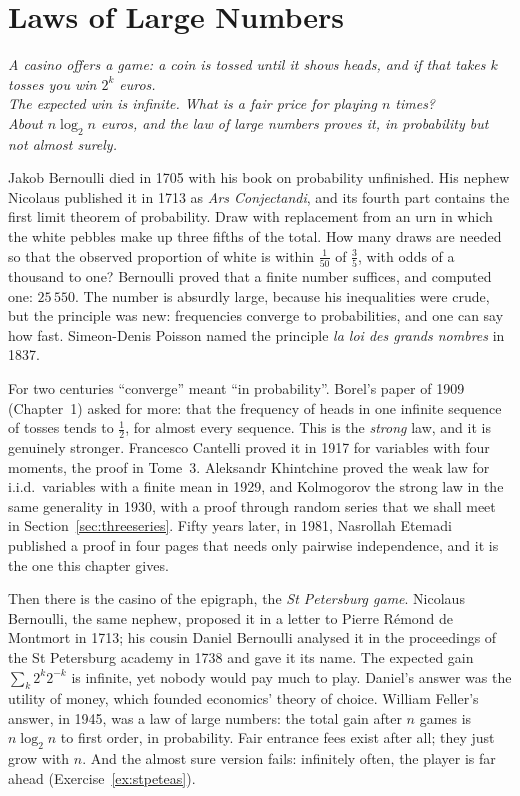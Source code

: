 \chapter{Laws of Large Numbers}
\begin{center}\itshape
A casino offers a game: a coin is tossed until it shows heads, and if that takes $k$ tosses you win $2^k$ euros.\\
The expected win is infinite. What is a fair price for playing $n$ times?\\
About $n\log_2n$ euros, and the law of large numbers proves it, in probability but not almost surely.
\end{center}

Jakob Bernoulli died in 1705 with his book on probability unfinished. His nephew Nicolaus published it in 1713 as \emph{Ars
Conjectandi}, and its fourth part contains the first limit theorem of probability. Draw with replacement from an urn in which
the white pebbles make up three fifths of the total. How many draws are needed so that the observed proportion of white is
within $\frac1{50}$ of $\frac35$, with odds of a thousand to one? Bernoulli proved that a finite number suffices, and computed
one: $25\,550$. The number is absurdly large, because his inequalities were crude, but the principle was new: frequencies converge
to probabilities, and one can say how fast. Simeon-Denis Poisson named the principle \emph{la loi des grands nombres} in 1837.

For two centuries ``converge'' meant ``in probability''. Borel's paper of 1909 (Chapter~1) asked for more: that the
frequency of heads in one infinite sequence of tosses tends to $\frac12$, for almost every sequence. This is the \emph{strong}
law, and it is genuinely stronger. Francesco Cantelli proved it in 1917 for variables with four moments, the proof in Tome~3.
Aleksandr Khintchine proved the weak law for i.i.d.\ variables with a finite mean in 1929, and Kolmogorov the strong law in the same
generality in 1930, with a proof through random series that we shall meet in Section~\ref{sec:threeseries}. Fifty years later, in 1981,
Nasrollah Etemadi published a proof in four pages that needs only pairwise independence, and it is the one this chapter gives.

Then there is the casino of the epigraph, the \emph{St Petersburg game}. Nicolaus Bernoulli, the same nephew, proposed it in a letter
to Pierre R\'emond de Montmort in 1713; his cousin Daniel Bernoulli analysed it in the proceedings of the St Petersburg academy in 1738
and gave it its name. The expected gain $\sum_k2^k2^{-k}$ is infinite, yet nobody would pay much to play. Daniel's answer was the
utility of money, which founded economics' theory of choice. William Feller's answer, in 1945, was a law of large numbers: the
total gain after $n$ games is $n\log_2n$ to first order, in probability. Fair entrance fees exist after all; they just grow with $n$.
And the almost sure version fails: infinitely often, the player is far ahead (Exercise~\ref{ex:stpeteas}).

